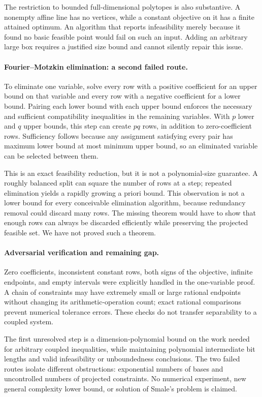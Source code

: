 \documentclass[11pt,a4paper]{article}
\begin{document}
The restriction to bounded full-dimensional polytopes is also substantive. A nonempty affine line has no vertices, while a constant objective on it has a finite attained optimum. An algorithm that reports infeasibility merely because it found no basic feasible point would fail on such an input. Adding an arbitrary large box requires a justified size bound and cannot silently repair this issue.

\paragraph{Fourier--Motzkin elimination: a second failed route.}
To eliminate one variable, solve every row with a positive coefficient for an upper bound on that variable and every row with a negative coefficient for a lower bound. Pairing each lower bound with each upper bound enforces the necessary and sufficient compatibility inequalities in the remaining variables. With $p$ lower and $q$ upper bounds, this step can create $pq$ rows, in addition to zero-coefficient rows. Sufficiency follows because any assignment satisfying every pair has maximum lower bound at most minimum upper bound, so an eliminated variable can be selected between them.

This is an exact feasibility reduction, but it is not a polynomial-size guarantee. A roughly balanced split can square the number of rows at a step; repeated elimination yields a rapidly growing a priori bound. This observation is not a lower bound for every conceivable elimination algorithm, because redundancy removal could discard many rows. The missing theorem would have to show that enough rows can always be discarded efficiently while preserving the projected feasible set. We have not proved such a theorem.

\paragraph{Adversarial verification and remaining gap.}
Zero coefficients, inconsistent constant rows, both signs of the objective, infinite endpoints, and empty intervals were explicitly handled in the one-variable proof. A chain of constraints may have extremely small or large rational endpoints without changing its arithmetic-operation count; exact rational comparisons prevent numerical tolerance errors. These checks do not transfer separability to a coupled system.

The first unresolved step is a dimension-polynomial bound on the work needed for arbitrary coupled inequalities, while maintaining polynomial intermediate bit lengths and valid infeasibility or unboundedness conclusions. The two failed routes isolate different obstructions: exponential numbers of bases and uncontrolled numbers of projected constraints. No numerical experiment, new general complexity lower bound, or solution of Smale's problem is claimed.
\end{document}
